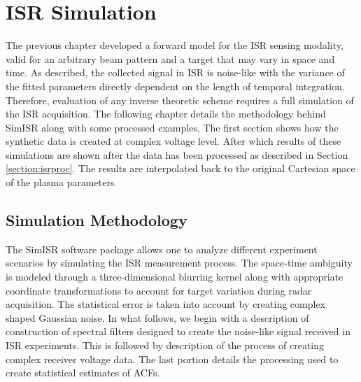 \chapter{ISR Simulation}
\label{chapter:stisrs}
\thispagestyle{myheadings}

\graphicspath{{4_STISRS/Figures/}}


The previous chapter developed a forward model for the ISR sensing modality, valid for an arbitrary beam pattern and a target that may vary in space and time.   As described, the collected signal in ISR is noise-like with the variance of the fitted parameters directly dependent on the length of temporal integration.   Therefore, evaluation of any inverse theoretic scheme requires a full simulation of the ISR acquisition. The following chapter details the methodology behind SimISR along with some processed examples. The first section shows how the synthetic data is created at complex voltage level. After which results of these simulations are shown after the data has been processed as described in Section \ref{section:isrproc}. The results are interpolated back to the original Cartesian space of the plasma parameters. 

\section{Simulation Methodology}
\label{sec:simmeth}
The SimISR software package allows one to analyze different  experiment scenarios by simulating the ISR measurement process. %
The space-time ambiguity is modeled through a three-dimensional blurring kernel along with appropriate coordinate transformations to account for target variation during radar acquisition.   The statistical error is taken into account by creating complex shaped Gaussian noise.    
In what follows, we begin with a description of construction of spectral filters designed to create the noise-like signal received in ISR experiments. This is followed by description of the process of creating complex receiver voltage data. The last portion details the processing used to create statistical estimates of ACFs.

